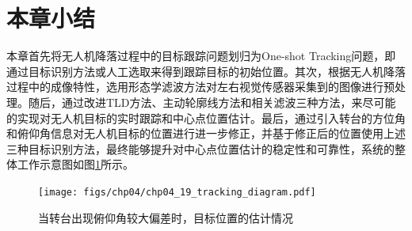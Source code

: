 \section{本章小结}
本章首先将无人机降落过程中的目标跟踪问题划归为One-shot Tracking问题，即通过目标识别方法或人工选取来得到跟踪目标的初始位置。其次，根据无人机降落过程中的成像特性，选用形态学滤波方法对左右视觉传感器采集到的图像进行预处理。随后，通过改进TLD方法、主动轮廓线方法和相关滤波三种方法，来尽可能的实现对无人机目标的实时跟踪和中心点位置估计。最后，通过引入转台的方位角和俯仰角信息对无人机目标的位置进行进一步修正，并基于修正后的位置使用上述三种目标识别方法，最终能够提升对中心点位置估计的稳定性和可靠性，系统的整体工作示意图如图\ref{fig:chp04_19_tracking_diagram}所示。


\begin{figure}[ht]   
	\centering
	\texttt{[image: figs/chp04/chp04\_19\_tracking\_diagram.pdf]}
	\caption{当转台出现俯仰角较大偏差时，目标位置的估计情况}
	\label{fig:chp04_19_tracking_diagram}
\end{figure}

